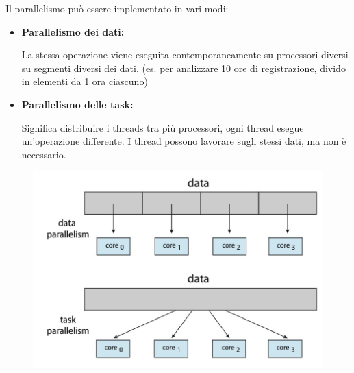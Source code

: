 \spacer
Il parallelismo può essere implementato in vari modi:
\begin{itemize}
    \item \textbf{Parallelismo dei dati:}

          La stessa operazione viene eseguita contemporaneamente su processori diversi su segmenti diversi dei dati. (es. per analizzare 10 ore di registrazione, divido in elementi da 1 ora ciascuno)

    \item \textbf{Parallelismo delle task:}

          Significa distribuire i threads tra più processori, ogni thread esegue un'operazione differente. I thread possono lavorare sugli stessi dati, ma non è necessario.
\end{itemize}

\begin{figure}[H]
    \centering
    \includegraphics[width=0.45\linewidth]{assets/data-task-parallelism.jpg}
\end{figure}
